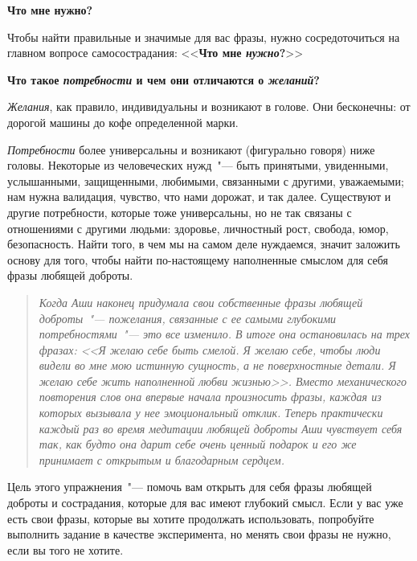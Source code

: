 \newpage
{\large \textbf{Что мне нужно?}} \label{What_Do_I_Need} 

\vspace{2ex}

Чтобы найти правильные и значимые для вас фразы, нужно сосредоточиться на главном вопросе самосострадания: <<\textbf{Что мне \textit{нужно}?}>>

\vspace{2ex}

\textbf{Что такое \emph{потребности} и чем они отличаются о \emph{желаний}? }

\vspace{2ex}

\emph{Желания}, как правило, индивидуальны и возникают в голове. Они бесконечны: от дорогой машины до кофе определенной марки.

\emph{Потребности} более универсальны и возникают (фигурально говоря) ниже головы. Некоторые из человеческих нужд~"--- быть принятыми, увиденными, услышанными, защищенными, любимыми, связанными с другими, уважаемыми; нам нужна валидация, чувство, что нами дорожат, и так далее. Существуют и другие потребности, которые тоже универсальны, но не так связаны с отношениями с другими людьми: здоровье, личностный рост, свобода, юмор, безопасность. Найти того, в чем мы на самом деле нуждаемся, значит заложить основу для того, чтобы найти по-настоящему наполненные смыслом для себя фразы любящей доброты.

\begin{quotation}
	\textit{
		Когда Аши наконец придумала свои собственные фразы любящей доброты~"--- пожелания, связанные с ее самыми глубокими потребностями~"--- это все изменило. В итоге она остановилась на трех фразах: <<Я желаю себе быть смелой. Я желаю себе, чтобы люди видели во мне мою истинную сущность, а не поверхностные детали. Я желаю себе жить наполненной любви жизнью>>. Вместо механического повторения слов она впервые начала произносить фразы, каждая из которых вызывала у нее эмоциональный отклик. Теперь практически каждый раз во время медитации любящей доброты Аши чувствует себя так, как будто она дарит себе очень ценный подарок и его же принимает с открытым и благодарным сердцем.
	}
\end{quotation}

\newpage
{} \label{Ex:Finding_Loving-Kindness_Phrases}

Цель этого упражнения~"--- помочь вам открыть для себя фразы любящей доброты и сострадания, которые для вас имеют глубокий смысл. Если у вас уже есть свои фразы, которые вы хотите продолжать использовать, попробуйте выполнить задание в качестве эксперимента, но менять свои фразы не нужно, если вы того не хотите.

